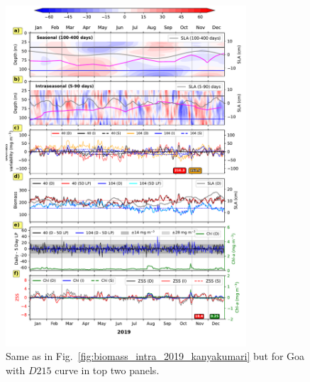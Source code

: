 \documentclass[12pt,a4paper]{article}
\begin{document}
\begin{figure}[htbp]
	\centering
	\includegraphics[width=0.8\textwidth]{./fig_s06_biomass_intra_2019_goa.pdf} 
	\caption{Same as in Fig.~\ref{fig:biomass_intra_2019_kanyakumari} but for Goa with $D215$ curve in top two panels.}		
	\label{fig:biomass_intra_2019_goa}
\end{figure}
\end{document}

